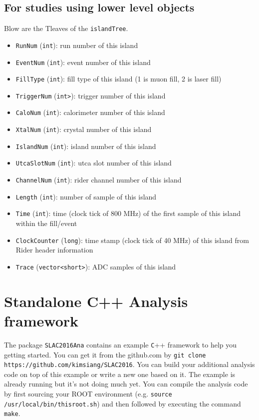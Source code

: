 \documentclass[12pt,letterpaper]{article}
\begin{document}
\subsection*{For studies using lower level objects}
Blow are the Tleaves of the \verb+islandTree+.

\begin{itemize}
\item \verb+RunNum+ (\verb+int+): run number of this island
\item \verb+EventNum+ (\verb+int+): event number of this island
\item \verb+FillType+ (\verb+int+): fill type of this island (1 is muon fill, 2 is laser fill)
\item \verb+TriggerNum+ (\verb+int>+): trigger number of this island
\item \verb+CaloNum+ (\verb+int+): calorimeter number of this island
\item \verb+XtalNum+ (\verb+int+): crystal number of this island
\item \verb+IslandNum+ (\verb+int+): island number of this island
\item \verb+UtcaSlotNum+ (\verb+int+): utca slot number of this island
\item \verb+ChannelNum+ (\verb+int+): rider channel number of this island
\item \verb+Length+ (\verb+int+): number of sample of this island
\item \verb+Time+ (\verb+int+): time (clock tick of 800 MHz) of the first sample of this island within the fill/event
\item \verb+ClockCounter+ (\verb+long+): time stamp (clock tick of 40 MHz) of this island from Rider header information
\item \verb+Trace+ (\verb+vector<short>+): ADC samples of this island
\end{itemize}

\section{Standalone C++ Analysis framework}

The package \verb+SLAC2016Ana+ contains an example \verb+C+++ framework to help you getting started. You can get it from the github.com by \verb+git clone https://github.com/kimsiang/SLAC2016+. You can build your additional analysis code on top of this example or write a new one based on it. The example is already running but it's not doing much yet. You can compile the analysis code by first sourcing your ROOT environment (e.g. \verb+source /usr/local/bin/thisroot.sh+) and then followed by executing the command \verb+make+.
\end{document}
